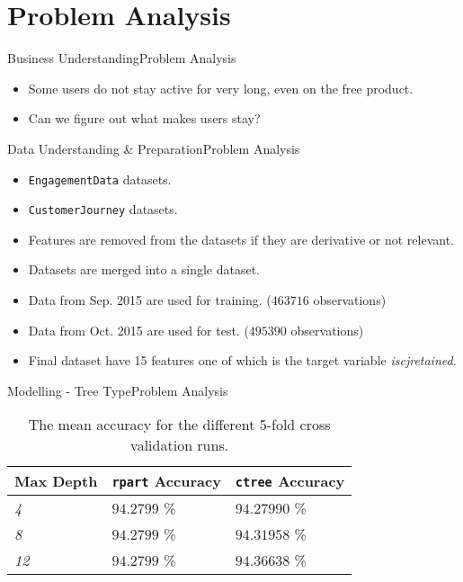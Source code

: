 \documentclass[12pt,aspectratio=1610]{beamer}
\newcommand{\graphicc}[4]{\begin{figure}[H] \centering
            \texttt{[image: \{\#2]}}
            \caption{{#3}} \label{#4} \end{figure}}
\begin{document}
\section{Problem Analysis}


\begin{frame}{Business Understanding}{Problem Analysis}
	\begin{itemize}
		\item Some users do not stay active for very long, even on the free product.
		\item Can we figure out what makes users stay?
	\end{itemize}
\end{frame}

\begin{frame}{Data Understanding \& Preparation}{Problem Analysis}
	\begin{itemize}
		\item \texttt{EngagementData} datasets.
		\item \texttt{CustomerJourney} datasets.
		\item Features are removed from the datasets if they are derivative or not relevant.
		\item Datasets are merged into a single dataset.
		\item Data from Sep. 2015 are used for training. ($463716$ observations)
		\item Data from Oct. 2015 are used for test. ($495390$ observations)
		\item Final dataset have 15 features one of which is the target variable \textit{iscjretained}.
	\end{itemize}
\end{frame}

\begin{frame}{Modelling - Tree Type}{Problem Analysis}
	\begin{table}[H]
	    \centering
	    \begin{tabular}{l|l|l}
	        \textbf{Max Depth} & \textbf{\texttt{rpart} Accuracy} & \textbf{\texttt{ctree} Accuracy} \\ \hline
	        \textit{4}         & $94.2799$ \%                     & $94.27990$ \%                    \\
	        \textit{8}         & $94.2799$ \%                     & $94.31958$ \%                    \\
	        \textit{12}        & $94.2799$ \%                     & $94.36638$ \%
	    \end{tabular}
	    \caption{The mean accuracy for the different 5-fold cross validation runs.}
	    \label{tab:treecompare}
	\end{table}
\end{frame}
\end{document}
